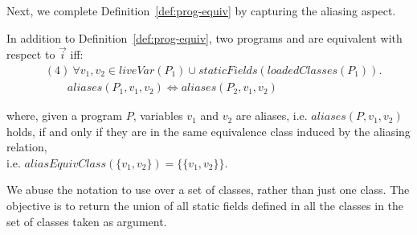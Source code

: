 \documentclass[sigconf,review,anonymous]{acmart}
\begin{document}
Next, we complete Definition~\ref{def:prog-equiv} by capturing the aliasing aspect.

\begin{definition}\label{def:prog-equiv-add}
   In addition to Definition~\ref{def:prog-equiv},
  two programs  and  are equivalent
  with respect to $\vec{i}$ iff:
\[
    \begin{aligned}
      & (4)~ \forall v_1,v_2 \in \mathit{liveVar}(P_1) \cup \mathit{staticFields}(loadedClasses(P_1)). \\
      & \qquad aliases(P_1, v_1, v_2) \Longleftrightarrow  aliases(P_2, v_1,v_2)      
    \end{aligned}
    \]
   
  \end{definition}

where, given a program $P$, variables $v_1$ and $v_2$ are aliases, i.e. $aliases(P, v_1, v_2)$ holds,
if and only if they are in the same equivalence class induced by the aliasing relation,\\
  i.e. $aliasEquivClass(\{v_1,v_2\}) = \{\{v_1,v_2\}\}$.

  We abuse the notation to use  over a set of classes, rather than just one class.
  The objective is to return the union of all static fields defined in all the classes in the set of classes taken as argument.





\end{document}
